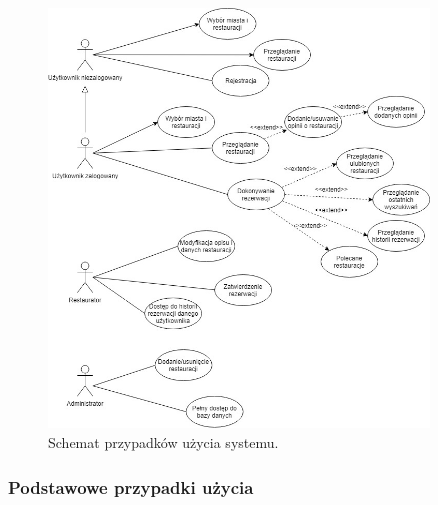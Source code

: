 \documentclass{article}
\begin{document}
\begin{figure}[H]
\centering
	\includegraphics[width=0.90\textwidth]{use_case.jpg}
	\caption{Schemat przypadków użycia systemu.}
\end{figure}

\subsubsection{Podstawowe przypadki użycia}
\end{document}
